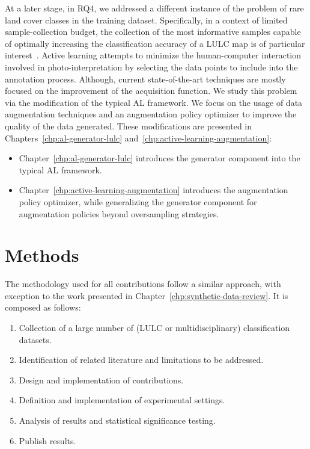 At a later stage, in RQ4, we addressed a different instance of the problem of
rare land cover classes in the training dataset. Specifically, in a context of
limited sample-collection budget, the collection of the most informative
samples capable of optimally increasing the classification accuracy of a LULC
map is of particular interest~\cite{Su2020}. Active learning attempts to
minimize the human-computer interaction involved in photo-interpretation by
selecting the data points to include into the annotation process. Although,
current state-of-the-art techniques are mostly focused on the improvement of
the acquisition function. We study this problem via the modification of the
typical AL framework. We focus on the usage of data augmentation techniques
and an augmentation policy optimizer to improve the quality of the data
generated. These modifications are presented in
Chapters~\ref{chp:al-generator-lulc}
and~\ref{chp:active-learning-augmentation}:

\begin{itemize}
    \item Chapter~\ref{chp:al-generator-lulc} introduces the generator
        component into the typical AL framework.
    \item Chapter~\ref{chp:active-learning-augmentation} introduces the
        augmentation policy optimizer, while generalizing the generator
        component for augmentation policies beyond oversampling strategies.
\end{itemize}

\section{Methods}

The methodology used for all contributions follow a similar approach, with
exception to the work presented in Chapter~\ref{chp:synthetic-data-review}.
It is composed as follows:

\begin{enumerate}
    \item Collection of a large number of (LULC or multidisciplinary)
        classification datasets.
    \item Identification of related literature and limitations to be addressed.
    \item Design and implementation of contributions.
    \item Definition and implementation of experimental settings.
    \item Analysis of results and statistical significance testing.
    \item Publish results.
\end{enumerate}

